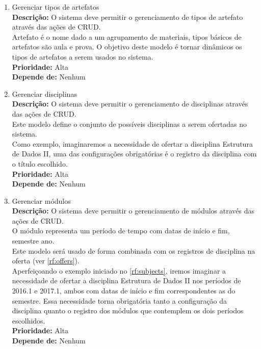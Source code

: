 \begin{enumerate}[label=\textbf{RF\protect\twodigits{\theenumi}}, leftmargin=2cm]
	\item \label{rf:artifact_types} Gerenciar tipos de artefatos \\
		\textbf{Descrição:} O sistema deve permitir o gerenciamento de tipos de artefato através das ações de CRUD. \\
		Artefato é o nome dado a um agrupamento de materiais, tipos básicos de artefatos são aula e prova. O objetivo deste modelo é tornar dinâmicos os tipos de artefatos a serem usados no sistema. \\
		\textbf{Prioridade:} Alta \\
		\textbf{Depende de:} Nenhum
				
	\item \label{rf:subjects} Gerenciar disciplinas \\
		\textbf{Descrição:} O sistema deve permitir o gerenciamento de disciplinas através das ações de CRUD. \\
		Este modelo define o conjunto de possíveis disciplinas a serem ofertadas no sistema. \\
		Como exemplo, imaginaremos a necessidade de ofertar a disciplina Estrutura de Dados II, uma das configurações obrigatórias é o registro da disciplina com o título escolhido. \\
		\textbf{Prioridade:} Alta \\
		\textbf{Depende de:} Nenhum

	\item \label{rf:modules} Gerenciar módulos \\ 
		\textbf{Descrição:} O sistema deve permitir o gerenciamento de módulos através das ações de CRUD. \\
		O módulo representa um período de tempo com datas de início e fim, semestre ano. \\
		Este modelo será usado de forma combinada com os registros de disciplina na oferta (ver \hyperref[rf:offers]{\ref{rf:offers}}). \\
		Aperfeiçoando o exemplo iniciado no \hyperref[rf:subjects]{\ref{rf:subjects}}, iremos imaginar a necessidade de ofertar a disciplina Estrutura de Dados II nos períodos de 2016.1 e 2017.1, ambos com datas de início e fim correspondentes as do semestre. Essa necessidade torna obrigatória tanto a configuração da disciplina quanto o registro dos módulos que contemplem os dois períodos escolhidos. \\
		\textbf{Prioridade:} Alta \\
		\textbf{Depende de:} Nenhum
		

\end{enumerate}
